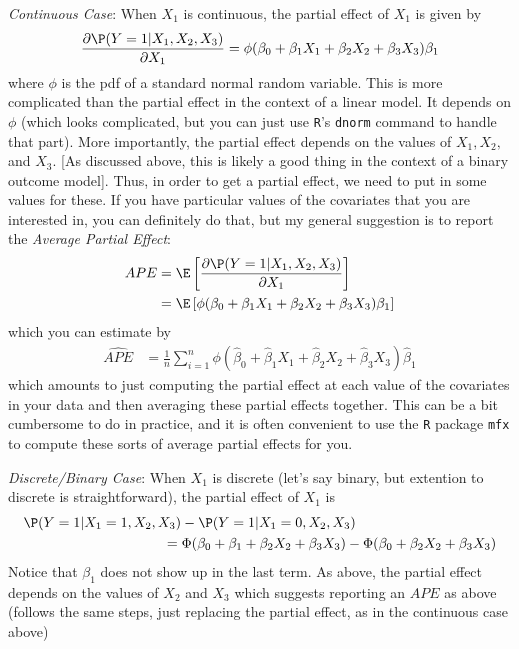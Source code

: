 \documentclass[
  letterpaper,
  DIV=11,
  numbers=noendperiod]{scrreprt}
\begin{document}
\emph{Continuous Case}: When \(X_1\) is continuous, the partial effect
of \(X_1\) is given by \begin{align*}
  \frac{\partial \P(Y=1|X_1,X_2,X_3)}{\partial X_1} = \phi(\beta_0 + \beta_1 X_1 + \beta_2 X_2 + \beta_3 X_3) \beta_1
\end{align*} where \(\phi\) is the pdf of a standard normal random
variable. This is more complicated than the partial effect in the
context of a linear model. It depends on \(\phi\) (which looks
complicated, but you can just use \texttt{R}'s \texttt{dnorm} command to
handle that part). More importantly, the partial effect depends on the
values of \(X_1,X_2,\) and \(X_3\). {[}As discussed above, this is
likely a good thing in the context of a binary outcome model{]}. Thus,
in order to get a partial effect, we need to put in some values for
these. If you have particular values of the covariates that you are
interested in, you can definitely do that, but my general suggestion is
to report the \emph{Average Partial Effect}: \begin{align*}
  APE &= \E\left[ \frac{\partial \P(Y=1|X_1,X_2,X_3)}{\partial X_1} \right] \\
  &= \E\left[ \phi(\beta_0 + \beta_1 X_1 + \beta_2 X_2 + \beta_3 X_3) \beta_1 \right]
\end{align*} which you can estimate by \begin{align*}
  \widehat{APE} &= \frac{1}{n} \sum_{i=1}^n \phi(\hat{\beta}_0 + \hat{\beta}_1 X_1 + \hat{\beta}_2 X_2 + \hat{\beta}_3 X_3) \hat{\beta}_1
\end{align*} which amounts to just computing the partial effect at each
value of the covariates in your data and then averaging these partial
effects together. This can be a bit cumbersome to do in practice, and it
is often convenient to use the \texttt{R} package \texttt{mfx} to
compute these sorts of average partial effects for you.

\emph{Discrete/Binary Case}: When \(X_1\) is discrete (let's say binary,
but extention to discrete is straightforward), the partial effect of
\(X_1\) is \begin{align*}
  & \P(Y=1|X_1=1, X_2, X_3) - \P(Y=1|X_1=0, X_2, X_3) \\
  &\hspace{100pt} = \Phi(\beta_0 + \beta_1 + \beta_2 X_2 + \beta_3 X_3) - \Phi(\beta_0 + \beta_2 X_2 + \beta_3 X_3)
\end{align*} Notice that \(\beta_1\) does not show up in the last term.
As above, the partial effect depends on the values of \(X_2\) and
\(X_3\) which suggests reporting an \(APE\) as above (follows the same
steps, just replacing the partial effect, as in the continuous case
above)
\end{document}
